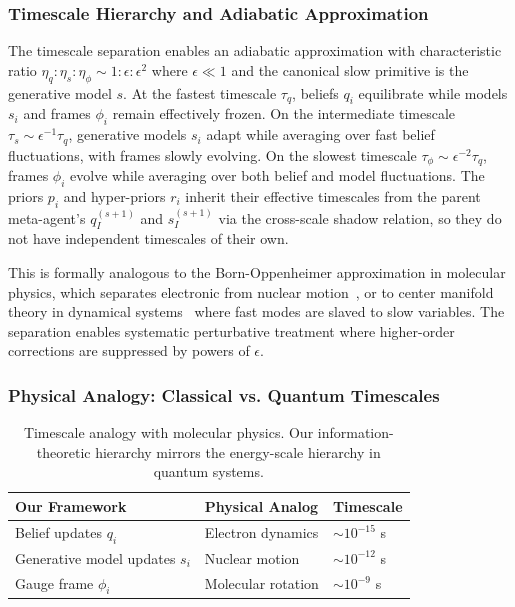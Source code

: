 \documentclass[11pt]{article}
\begin{document}
\subsubsection{Timescale Hierarchy and Adiabatic Approximation}

The timescale separation enables an adiabatic approximation with characteristic ratio $\eta_q : \eta_s : \eta_\phi \sim 1 : \epsilon : \epsilon^2$ where $\epsilon \ll 1$ and the canonical slow primitive is the generative model $s$. At the fastest timescale $\tau_q$, beliefs $q_i$ equilibrate while models $s_i$ and frames $\phi_i$ remain effectively frozen. On the intermediate timescale $\tau_s \sim \epsilon^{-1} \tau_q$, generative models $s_i$ adapt while averaging over fast belief fluctuations, with frames slowly evolving. On the slowest timescale $\tau_\phi \sim \epsilon^{-2} \tau_q$, frames $\phi_i$ evolve while averaging over both belief and model fluctuations. The priors $p_i$ and hyper-priors $r_i$ inherit their effective timescales from the parent meta-agent's $q_I^{(s+1)}$ and $s_I^{(s+1)}$ via the cross-scale shadow relation, so they do not have independent timescales of their own.

This is formally analogous to the Born-Oppenheimer approximation in molecular physics, which separates electronic from nuclear motion~\cite{Born1927}, or to center manifold theory in dynamical systems~\cite{Carr1981} where fast modes are slaved to slow variables. The separation enables systematic perturbative treatment where higher-order corrections are suppressed by powers of $\epsilon$.

\subsubsection{Physical Analogy: Classical vs. Quantum Timescales}

\begin{table}[h]
\centering
\begin{tabular}{|l|l|l|}
\hline
\textbf{Our Framework} & \textbf{Physical Analog} & \textbf{Timescale} \\
\hline
Belief updates $q_i$ & Electron dynamics & $\sim 10^{-15}$ s \\
Generative model updates $s_i$ & Nuclear motion & $\sim 10^{-12}$ s \\
Gauge frame $\phi_i$ & Molecular rotation & $\sim 10^{-9}$ s \\
\hline
\end{tabular}
\caption{Timescale analogy with molecular physics. Our information-theoretic hierarchy mirrors the energy-scale hierarchy in quantum systems.}
\end{table}
\end{document}
